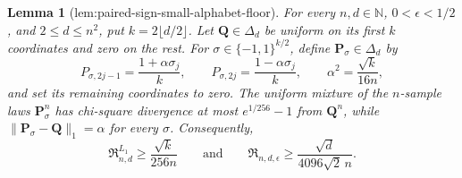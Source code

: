 \documentclass{article}
\newtheorem{lemma}{Lemma}
\begin{document}
\begin{lemma}[lem:paired-sign-small-alphabet-floor]\label{lem:paired-sign-small-alphabet-floor}
For every \(n,d\in\mathbb N\), \(0<\epsilon<1/2\), and \(2\le d\le n^2\), put \(k=2\lfloor d/2\rfloor\).  Let \(\mathbf Q\in\Delta_d\) be uniform on its first \(k\) coordinates and zero on the rest.  For \(\sigma\in\{-1,1\}^{k/2}\), define \(\mathbf P_\sigma\in\Delta_d\) by
\[
 P_{\sigma,2j-1}=\frac{1+\alpha\sigma_j}{k},\qquad
 P_{\sigma,2j}=\frac{1-\alpha\sigma_j}{k},
 \qquad
 \alpha^2=\frac{\sqrt{k}}{16n},
\]
and set its remaining coordinates to zero.  The uniform mixture of the \(n\)-sample laws \(\mathbf P_\sigma^n\) has chi-square divergence at most \(e^{1/256}-1\) from \(\mathbf Q^n\), while \(\lVert\mathbf P_\sigma-\mathbf Q\rVert_1=\alpha\) for every \(\sigma\).  Consequently,
\[
 \mathfrak R^{L_1}_{n,d}\ge \frac{\sqrt{k}}{256n}
 \qquad\text{and}\qquad
 \mathfrak R_{n,d,\epsilon}
 \ge \frac{\sqrt d}{4096\sqrt2\,n}.
\]
\end{lemma}
\end{document}
